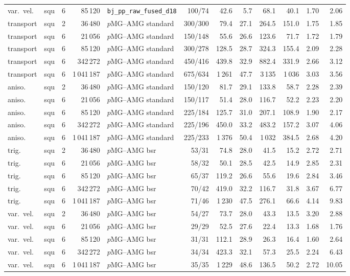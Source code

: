 \begin{tabular}{llrrlrrrrrrr}
var.\ vel. & squ & 6 & 85\,120 & \texttt{bj\_pp\_raw\_fused\_d18} & 100/74 & 42.6 & 5.7 & 68.1 & 40.1 & 1.70 & 2.06\\
transport & squ & 2 & 36\,480 & $p$MG--AMG standard & 300/300 & 79.4 & 27.1 & 264.5 & 151.0 & 1.75 & 1.85\\
transport & squ & 6 & 21\,056 & $p$MG--AMG standard & 150/148 & 55.6 & 26.6 & 123.6 & 71.7 & 1.72 & 1.79\\
transport & squ & 6 & 85\,120 & $p$MG--AMG standard & 300/278 & 128.5 & 28.7 & 324.3 & 155.4 & 2.09 & 2.28\\
transport & squ & 6 & 342\,272 & $p$MG--AMG standard & 450/416 & 439.8 & 32.9 & 882.4 & 331.9 & 2.66 & 3.12\\
transport & squ & 6 & 1\,041\,187 & $p$MG--AMG standard & 675/634 & 1\,261 & 47.7 & 3\,135 & 1\,036 & 3.03 & 3.56\\
aniso. & squ & 2 & 36\,480 & $p$MG--AMG standard & 150/120 & 81.7 & 29.1 & 133.8 & 58.7 & 2.28 & 2.39\\
aniso. & squ & 6 & 21\,056 & $p$MG--AMG standard & 150/117 & 51.4 & 28.0 & 116.7 & 52.2 & 2.23 & 2.20\\
aniso. & squ & 6 & 85\,120 & $p$MG--AMG standard & 225/184 & 125.7 & 31.0 & 207.1 & 108.9 & 1.90 & 2.17\\
aniso. & squ & 6 & 342\,272 & $p$MG--AMG standard & 225/196 & 450.0 & 33.2 & 483.2 & 157.2 & 3.07 & 4.06\\
aniso. & squ & 6 & 1\,041\,187 & $p$MG--AMG standard & 225/233 & 1\,376 & 50.4 & 1\,032 & 384.5 & 2.68 & 4.20\\
trig. & squ & 2 & 36\,480 & $p$MG--AMG bsr & 53/31 & 74.8 & 28.0 & 41.5 & 15.2 & 2.72 & 2.71\\
trig. & squ & 6 & 21\,056 & $p$MG--AMG bsr & 58/32 & 50.1 & 28.5 & 42.5 & 14.9 & 2.85 & 2.31\\
trig. & squ & 6 & 85\,120 & $p$MG--AMG bsr & 65/37 & 119.2 & 26.6 & 55.6 & 19.6 & 2.84 & 3.46\\
trig. & squ & 6 & 342\,272 & $p$MG--AMG bsr & 70/42 & 419.0 & 32.2 & 116.7 & 31.8 & 3.67 & 6.77\\
trig. & squ & 6 & 1\,041\,187 & $p$MG--AMG bsr & 71/46 & 1\,230 & 47.5 & 276.1 & 66.6 & 4.14 & 9.83\\
var.\ vel. & squ & 2 & 36\,480 & $p$MG--AMG bsr & 54/27 & 73.7 & 28.0 & 43.3 & 13.5 & 3.20 & 2.88\\
var.\ vel. & squ & 6 & 21\,056 & $p$MG--AMG bsr & 29/29 & 52.5 & 27.6 & 22.4 & 13.3 & 1.68 & 1.76\\
var.\ vel. & squ & 6 & 85\,120 & $p$MG--AMG bsr & 31/31 & 112.1 & 28.9 & 26.3 & 16.4 & 1.60 & 2.64\\
var.\ vel. & squ & 6 & 342\,272 & $p$MG--AMG bsr & 34/34 & 423.3 & 32.1 & 57.3 & 25.5 & 2.24 & 6.43\\
var.\ vel. & squ & 6 & 1\,041\,187 & $p$MG--AMG bsr & 35/35 & 1\,229 & 48.6 & 136.5 & 50.2 & 2.72 & 10.05\\
\bottomrule
\end{tabular}

